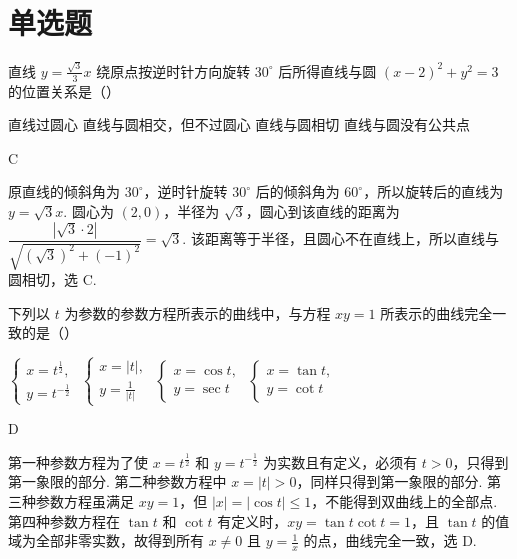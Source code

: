 \documentclass[UTF8,a4paper,oneside,11pt]{ctexbook}
\begin{document}
\section{单选题}

\begin{problem}
直线 \(y=\frac{\sqrt{3}}{3}x \) 绕原点按逆时针方向旋转 \(30^{\circ} \) 后所得直线与圆 \((x-2)^{2}+y^{2}=3 \) 的位置关系是（\quad）

\choices
    {直线过圆心}
    {直线与圆相交，但不过圆心}
    {直线与圆相切}
    {直线与圆没有公共点}
\end{problem}

\begin{answer}
C
\end{answer}

\begin{solution}
原直线的倾斜角为 \(30^{\circ}\)，逆时针旋转 \(30^{\circ}\) 后的倾斜角为 \(60^{\circ}\)，所以旋转后的直线为 \(y=\sqrt3x\). 圆心为 \((2,0)\)，半径为 \(\sqrt3\)，圆心到该直线的距离为
\(\dfrac{|\sqrt3\cdot2|}{\sqrt{(\sqrt3)^2+(-1)^2}}=\sqrt3\). 该距离等于半径，且圆心不在直线上，所以直线与圆相切，选 C.
\end{solution}

\begin{problem}
下列以 \(t\) 为参数的参数方程所表示的曲线中，与方程 \(xy = 1\) 所表示的曲线完全一致的是（\quad）

\choices
    {\(\begin{cases}
        x=t^{\frac{1}{2}},\\
        y=t^{-\frac{1}{2}}
    \end{cases}\)}
    {\(\begin{cases}
        x=|t|,\\
        y=\frac{1}{|t|}
    \end{cases}\)}
    {\(\begin{cases}
        x=\cos t,\\
        y=\sec t
    \end{cases}\)}
    {\(\begin{cases}
        x=\tan t,\\
        y=\cot t
    \end{cases}\)}
\end{problem}

\begin{answer}
D
\end{answer}

\begin{solution}
第一种参数方程为了使 \(x=t^{\frac{1}{2}}\) 和 \(y=t^{-\frac{1}{2}}\) 为实数且有定义，必须有 \(t>0\)，只得到第一象限的部分. 第二种参数方程中 \(x=|t|>0\)，同样只得到第一象限的部分. 第三种参数方程虽满足 \(xy=1\)，但 \(|x|=|\cos t|\leq1\)，不能得到双曲线上的全部点. 第四种参数方程在 \(\tan t\) 和 \(\cot t\) 有定义时，\(xy=\tan t\cot t=1\)，且 \(\tan t\) 的值域为全部非零实数，故得到所有 \(x\ne0\) 且 \(y=\frac{1}{x}\) 的点，曲线完全一致，选 D.
\end{solution}
\end{document}
